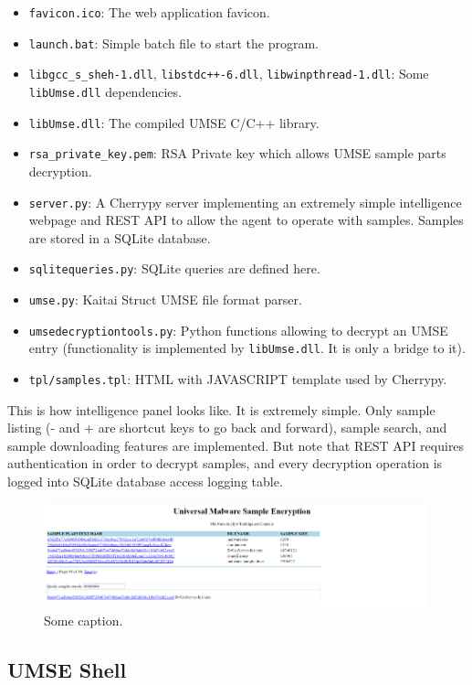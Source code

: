 \begin{itemize}
\item \texttt{favicon.ico}: The web application favicon.
\item \texttt{launch.bat}: Simple batch file to start the program.
\item \texttt{libgcc\_s\_sheh-1.dll}, \texttt{libstdc++-6.dll},
  \texttt{libwinpthread-1.dll}: Some \texttt{libUmse.dll} dependencies.
\item \texttt{libUmse.dll}: The compiled UMSE C/C++ library.
\item \texttt{rsa\_private\_key.pem}: RSA Private key which allows UMSE sample
  parts decryption.
\item \texttt{server.py}: A Cherrypy server implementing an extremely simple
  intelligence webpage and REST API to allow the agent to operate with
  samples. Samples are stored in a SQLite database.
\item \texttt{sqlitequeries.py}: SQLite queries are defined here.
\item \texttt{umse.py}: Kaitai Struct UMSE file format parser.
\item \texttt{umsedecryptiontools.py}: Python functions allowing to decrypt an
  UMSE entry (functionality is implemented by \texttt{libUmse.dll}. It is only
  a bridge to it).
\item \texttt{tpl/samples.tpl}: HTML with JAVASCRIPT template used by
  Cherrypy.
\end{itemize}

This is how intelligence panel looks like. It is extremely simple. Only
sample listing (- and + are shortcut keys to go back and forward), sample
search, and sample downloading features are implemented. But note that REST
API requires authentication in order to decrypt samples, and every decryption
operation is logged into SQLite database access logging table.
\begin{figure}[h]
  \centering
  \includegraphics[width=0.99\textwidth]{./figures/UMSEPanel}
  \caption{\label{fig:UMSEPanel} Some caption.}
\end{figure}

\subsection{UMSE Shell}

